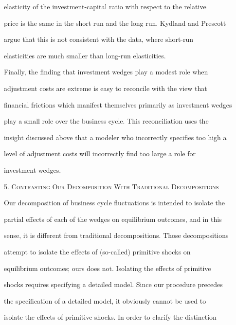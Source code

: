 \documentclass[fleqn,leqno,11pt]{article}
\begin{document}
elasticity of the investment-capital ratio with respect to the relative

price is the same in the short run and the long run. Kydland and Prescott

argue that this is not consistent with the data, where short-run

elasticities are much smaller than long-run elasticities.



Finally, the finding that investment wedges play a modest role when

adjustment costs are extreme is easy to reconcile with the view that

financial frictions which manifest themselves primarily as investment wedges

play a small role over the business cycle. This reconciliation uses the

insight discussed above that a modeler who incorrectly specifies too high a

level of adjustment costs will incorrectly find too large a role for

investment wedges.



\bigskip



\begin{center}

5. \textsc{Contrasting Our Decomposition With Traditional Decompositions}

\end{center}



Our decomposition of business cycle fluctuations is intended to isolate the

partial effects of each of the wedges on equilibrium outcomes, and in this

sense, it is different from traditional decompositions. Those decompositions

attempt to isolate the effects of (so-called) primitive shocks on

equilibrium outcomes; ours does not. Isolating the effects of primitive

shocks requires specifying a detailed model. Since our procedure precedes

the specification of a detailed model, it obviously cannot be used to

isolate the effects of primitive shocks. In order to clarify the distinction
\end{document}
